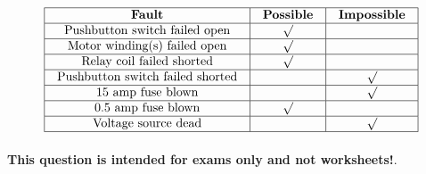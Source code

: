 \eject







$$\vbox{\offinterlineskip
\halign{\strut
\vrule \quad\hfil # \ \hfil & 
\vrule \quad\hfil # \ \hfil & 
\vrule \quad\hfil # \ \hfil \vrule \cr
\noalign{\hrule}
%
{\bf Fault} & {\bf Possible} & {\bf Impossible} \cr
%
\noalign{\hrule}
%
Pushbutton switch failed open & $\surd$ &  \cr
%
\noalign{\hrule}
%
Motor winding(s) failed open & $\surd$ &  \cr
%
\noalign{\hrule}
%
Relay coil failed shorted & $\surd$ &  \cr
%
\noalign{\hrule}
%
Pushbutton switch failed shorted &  & $\surd$ \cr
%
\noalign{\hrule}
%
15 amp fuse blown &  & $\surd$ \cr
%
\noalign{\hrule}
%
0.5 amp fuse blown & $\surd$ &  \cr
%
\noalign{\hrule}
%
Voltage source dead &  & $\surd$ \cr
%
\noalign{\hrule}
} %
}$$ %







{\bf This question is intended for exams only and not worksheets!}.


